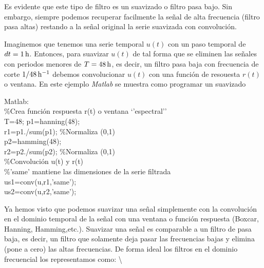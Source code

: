 \documentclass[
]{agujournal2019}
\begin{document}
Es evidente que este tipo de filtro es un suavizado o filtro pasa bajo.
Sin embargo, siempre podemos recuperar facilmente la señal de alta
frecuencia (filtro pasa altas) restando a la señal original la serie
suavizada con convolución.

Imaginemos que tenemos una serie temporal \(u(t)\) con un paso temporal
de \(dt=1\,{\rm h}\). Entonces, para suavizar \(u(t)\) de tal forma que
se eliminen las señales con periodos menores de \(T=48\,{\rm h}\), es
decir, un filtro pasa baja con frecuencia de corte
\(1/48\,{\rm h}^{-1}\) debemos convolucionar \(u(t)\) con una función de
resouesta \(r(t)\) o ventana. En este ejemplo \emph{Matlab} se muestra
como programar un suavizado

\begin{framed}
{\textbf \noindent Matlab}:\\
\%Crea función respuesta r(t) o ventana `'espectral''\\
T=48; %
p1=hanning(48);\\
r1=p1./sum(p1); \%Normaliza (0,1)\\
p2=hamming(48);\\
r2=p2./sum(p2); \%Normaliza (0,1)\\

\%Convolución u(t) y r(t)\\
\%'same' mantiene las dimensiones de la serie filtrada\\
us1=conv(u,r1,'same');\\
us2=conv(u,r2,'same');\\

\end{framed}

Ya hemos visto que podemos suavizar una señal simplemente con la
convolución en el dominio temporal de la señal con una ventana o función
respuesta (Boxcar, Hanning, Hamming,etc.). Suavizar una señal es
comparable a un filtro de pasa baja, es decir, un filtro que solamente
deja pasar las frecuencias bajas y elimina (pone a cero) las altas
frecuencias. De forma ideal los filtros en el dominio frecuencial los
representamos como: \textbackslash{}
\end{document}
